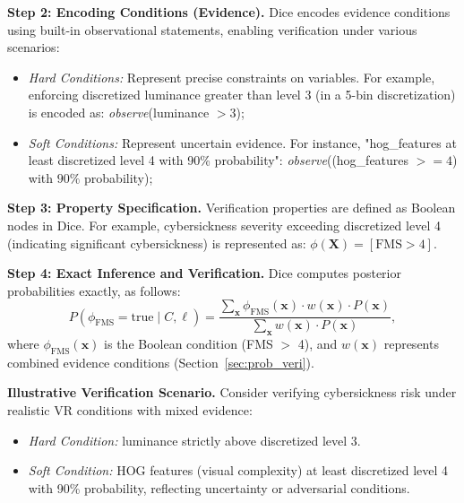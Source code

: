 \documentclass{vgtc}                          %
\begin{document}
\noindent\textbf{Step 2: Encoding Conditions (Evidence).}
Dice encodes evidence conditions using built-in observational statements, enabling verification under various scenarios:
\begin{itemize}[leftmargin=*, itemsep=0pt, topsep=2pt] 
    \item \textit{Hard Conditions:} Represent precise constraints on variables. For example, enforcing discretized luminance greater than level 3 (in a 5-bin discretization) is encoded as:
\textit{observe}(luminance $> 3$);

    \item \textit{Soft Conditions:} Represent uncertain evidence. For instance, "hog\_features at least discretized level 4 with 90\% probability":
\textit{observe}((hog\_features $>= 4$) with $90\%$ probability);
\end{itemize}
\vspace{1pt}
\noindent\textbf{Step 3: Property Specification.}
Verification properties are defined as Boolean nodes in Dice. For example, cybersickness severity exceeding discretized level 4 (indicating significant cybersickness) is represented as: \(\phi(\mathbf{X}) = [\mathrm{FMS} > 4]\).

\vspace{1pt}
\noindent\textbf{Step 4: Exact Inference and Verification.}
Dice computes posterior probabilities exactly, as follows:
\begin{equation}
    P(\phi_{\text{FMS}} = \text{true} \mid C, \ell) =
    \frac{\sum_{\mathbf{x}} \phi_{\text{FMS}}(\mathbf{x}) \cdot w(\mathbf{x}) \cdot P(\mathbf{x})}
    {\sum_{\mathbf{x}} w(\mathbf{x}) \cdot P(\mathbf{x})},
\end{equation}
where \(\phi_{\text{FMS}}(\mathbf{x})\) is the Boolean condition (FMS $>$ 4), and \(w(\mathbf{x})\) represents combined evidence conditions (Section~\ref{sec:prob_veri}).

\vspace{2pt}
\noindent\textbf{Illustrative Verification Scenario.}
Consider verifying cybersickness risk under realistic VR conditions with mixed evidence:
\begin{itemize}[leftmargin=*, itemsep=0pt, topsep=2pt]
    \item \textit{Hard Condition:} luminance strictly above discretized level 3.
    \item \textit{Soft Condition:} HOG features (visual complexity) at least discretized level 4 with 90\% probability, reflecting uncertainty or adversarial conditions.
\end{itemize}
\end{document}

